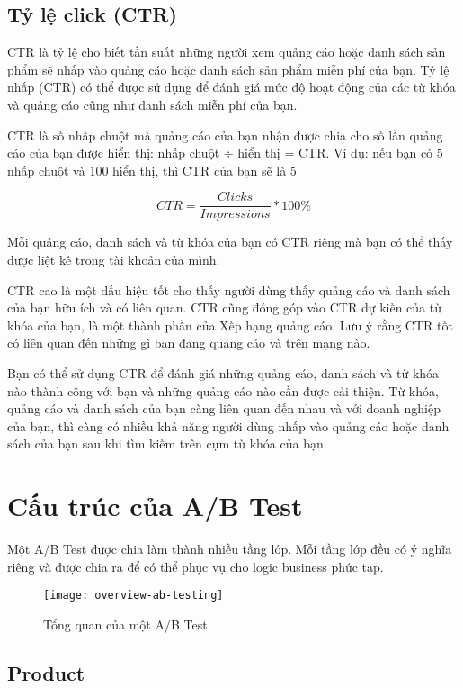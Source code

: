 \subsection{Tỷ lệ click (CTR)}

CTR là tỷ lệ cho biết tần suất những người xem quảng cáo hoặc danh sách sản phẩm sẽ nhấp vào quảng cáo hoặc danh sách sản phẩm miễn phí của bạn. Tỷ lệ nhấp (CTR) có thể được sử dụng để đánh giá mức độ hoạt động của các từ khóa và quảng cáo cũng như danh sách miễn phí của bạn.

CTR là số nhấp chuột mà quảng cáo của bạn nhận được chia cho số lần quảng cáo của bạn được hiển thị: nhấp chuột ÷ hiển thị = CTR. Ví dụ: nếu bạn có 5 nhấp chuột và 100 hiển thị, thì CTR của bạn sẽ là 5%

\begin{displaymath}
	CTR = \frac{Clicks}{Impressions} * 100\%
\end{displaymath}

Mỗi quảng cáo, danh sách và từ khóa của bạn có CTR riêng mà bạn có thể thấy được liệt kê trong tài khoản của mình.

CTR cao là một dấu hiệu tốt cho thấy người dùng thấy quảng cáo và danh sách của bạn hữu ích và có liên quan. CTR cũng đóng góp vào CTR dự kiến của từ khóa của bạn, là một thành phần của Xếp hạng quảng cáo. Lưu ý rằng CTR tốt có liên quan đến những gì bạn đang quảng cáo và trên mạng nào.

Bạn có thể sử dụng CTR để đánh giá những quảng cáo, danh sách và từ khóa nào thành công với bạn và những quảng cáo nào cần được cải thiện. Từ khóa, quảng cáo và danh sách của bạn càng liên quan đến nhau và với doanh nghiệp của bạn, thì càng có nhiều khả năng người dùng nhấp vào quảng cáo hoặc danh sách của bạn sau khi tìm kiếm trên cụm từ khóa của bạn.

\section{Cấu trúc của A/B Test}

Một A/B Test được chia làm thành nhiều tầng lớp.  Mỗi tầng lớp đều có ý nghĩa riêng và được chia ra để có thể phục vụ cho logic business phức tạp.

\begin{figure}[H]
	\centering
	\texttt{[image: overview-ab-testing]}
	\caption{Tổng quan của một A/B Test}
\end{figure}

\subsection{Product}

